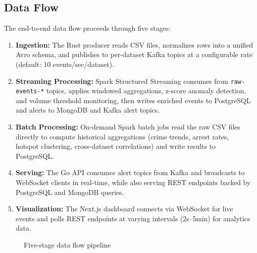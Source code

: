 \documentclass[12pt,a4paper]{article}
\begin{document}
\subsection{Data Flow}

The end-to-end data flow proceeds through five stages:

\begin{enumerate}
  \item \textbf{Ingestion:} The Rust producer reads CSV files, normalizes rows into a unified Avro schema, and publishes to per-dataset Kafka topics at a configurable rate (default: 10 events/sec/dataset).
  \item \textbf{Streaming Processing:} Spark Structured Streaming consumes from \texttt{raw-events-*} topics, applies windowed aggregations, z-score anomaly detection, and volume threshold monitoring, then writes enriched events to PostgreSQL and alerts to MongoDB and Kafka alert topics.
  \item \textbf{Batch Processing:} On-demand Spark batch jobs read the raw CSV files directly to compute historical aggregations (crime trends, arrest rates, hotspot clustering, cross-dataset correlations) and write results to PostgreSQL.
  \item \textbf{Serving:} The Go API consumes alert topics from Kafka and broadcasts to WebSocket clients in real-time, while also serving REST endpoints backed by PostgreSQL and MongoDB queries.
  \item \textbf{Visualization:} The Next.js dashboard connects via WebSocket for live events and polls REST endpoints at varying intervals (2s--5min) for analytics data.
\end{enumerate}

\begin{figure}[H]
\centering
{}
\caption{Five-stage data flow pipeline}
\label{fig:dataflow}
\end{figure}
\end{document}
